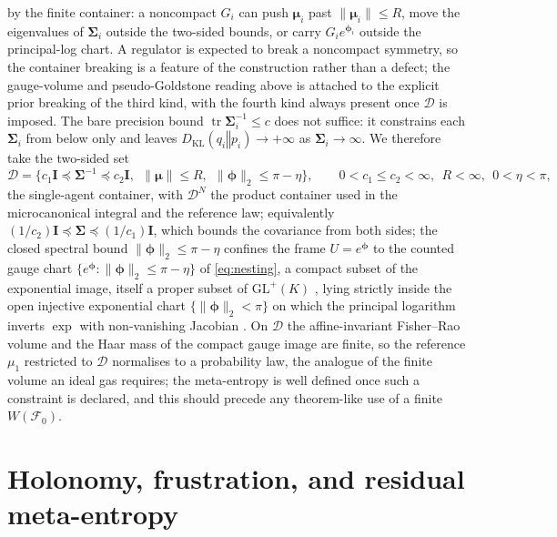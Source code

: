 \documentclass[11pt]{article}
\theoremstyle{plain}
\theoremstyle{definition}
\newcommand{\KL}[2]{D_{\mathrm{KL}}\mathopen{}\left(#1 \mathbin{\Vert} #2\right)\mathclose{}}
\newcommand{\tr}{\operatorname{tr}}
\newcommand{\GL}{\mathrm{GL}}
\newcommand{\bmu}{\boldsymbol{\mu}}
\newcommand{\bSigma}{\boldsymbol{\Sigma}}
\newcommand{\bphi}{\boldsymbol{\phi}}
\newcommand{\bI}{\mathbf{I}}
\newcommand{\Fcal}{\mathcal{F}}
\newcommand{\Dcal}{\mathcal{D}}
\newcommand{\Wmeta}{W}
\begin{document}
by the finite container: a noncompact $G_i$ can push $\bmu_i$ past $\|\bmu_i\|\le R$, move the
eigenvalues of $\bSigma_i$ outside the two-sided bounds, or carry $G_ie^{\bphi_i}$ outside the
principal-log chart. A regulator is expected to break a noncompact symmetry, so the container
breaking is a feature of the construction rather than a defect; the gauge-volume and
pseudo-Goldstone reading above is attached to the explicit prior breaking of the third kind, with
the fourth kind always present once $\Dcal$ is imposed. The bare precision bound
$\tr\bSigma_i^{-1}\le c$ does not suffice: it constrains each $\bSigma_i$ from below only
and leaves $\KL{q_i}{p_i}\to+\infty$ as $\bSigma_i\to\infty$. We therefore take the
two-sided set
\begin{equation}
\label{eq:container}
\Dcal=\bigl\{c_1\bI\preceq\bSigma^{-1}\preceq c_2\bI,\ \ \|\bmu\|\le R,\ \ \|\bphi\|_2\le\pi-\eta\bigr\},
\qquad 0<c_1\le c_2<\infty,\ \ R<\infty,\ \ 0<\eta<\pi,
\end{equation}
the single-agent container, with $\Dcal^{N}$ the product container used in the microcanonical
integral and the reference law; equivalently $(1/c_2)\bI\preceq\bSigma\preceq(1/c_1)\bI$, which
bounds the covariance from both sides; the closed spectral bound $\|\bphi\|_2\le\pi-\eta$ confines
the frame $U=e^{\bphi}$ to the counted gauge chart $\{e^{\bphi}:\|\bphi\|_2\le\pi-\eta\}$ of
\cref{eq:nesting}, a compact subset of the exponential image, itself a proper subset of
$\GL^{+}(K)$ \citep{culver1966existence}, lying strictly inside the open injective exponential chart
$\{\|\bphi\|_2<\pi\}$ on which the principal logarithm inverts $\exp$ with non-vanishing
Jacobian \citep{higham2008functions}. On
$\Dcal$ the affine-invariant Fisher--Rao volume and the Haar mass of the compact gauge
image are finite, so the reference $\mu_1$ restricted to $\Dcal$ normalises to a
probability law, the analogue of the finite volume an ideal gas requires; the meta-entropy
is well defined once such a constraint is declared, and this should precede any
theorem-like use of a finite $\Wmeta(\Fcal_0)$.

\section{Holonomy, frustration, and residual meta-entropy}
\label{sec:frustration}
\end{document}
